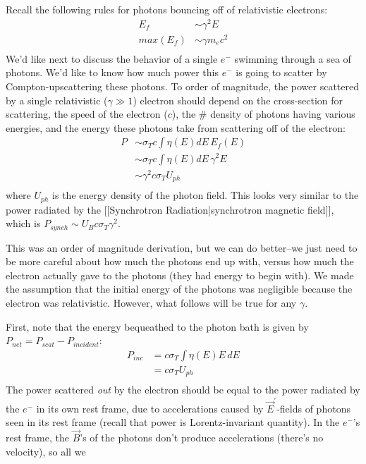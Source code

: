\documentclass{article}
\def\ef{\vec E}
\def\ef{\vec E}
\def\bfield{{\vec B}}
\begin{document}
Recall the following rules for photons bouncing off of relativistic electrons:
$$\begin{aligned}E_f&\sim\gamma^2E\\ 
max(E_f)&\sim\gamma m_ec^2\\ \end{aligned}$$
We'd like next to discuss the behavior of a single $e^-$ swimming through a sea
of photons.  We'd like to know how much power this $e^-$ is going to scatter
by Compton-upscattering these photons.  To order of magnitude, the power
scattered by a single relativistic ($\gamma\gg1$) electron should depend on the 
cross-section for scattering, the speed of the electron ($c$), the \# density 
of photons having various energies, and the energy these photons take from
scattering off of the electron:
$$\begin{aligned}P&\sim\sigma_Tc\int{\eta(E)dE\,E_f(E)}\\ 
&\sim\sigma_Tc\int{\eta(E)dE\,\gamma^2E}\\ 
&\sim\gamma^2c\sigma_T U_{ph}\\ \end{aligned}$$
where $U_{ph}$ is the energy density of the photon field.  This looks very
similar to the power radiated by the [[Synchrotron Radiation|synchrotron magnetic field]], which is
$P_{synch}\sim U_Bc\sigma_T\gamma^2$.\par
This was an order of magnitude derivation, but we can do better--we just need
to be more careful about how much the photons end up with, versus how
much the electron actually gave to the photons (they had energy to begin with).
We made the assumption that the initial energy of the photons was negligible
because the electron was relativistic.  However, what follows will be true
for any $\gamma$.\par
First, note that the energy bequeathed to the photon bath is given by 
$P_{net}=P_{scat}-P_{incident}$:
$$\begin{aligned}P_{inc}&=c\sigma_T\int{\eta(E)E\,dE}\\ 
&=c\sigma_TU_{ph}\\ \end{aligned}$$
The power scattered {\it out} by the electron should be equal to the 
power radiated by the $e^-$ in its own rest frame, due to accelerations caused
by $\ef^\prime$-fields of photons seen in its rest frame (recall that power
is Lorentz-invariant quantity).  In the $e^-$'s rest frame, the $\bfield$'s of
the photons don't produce accelerations (there's no velocity), so all we
\end{document}
